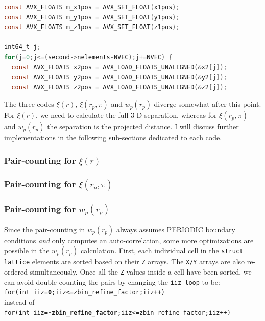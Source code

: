 \documentclass[12pt,titlepage,justified]{article}
\newcommand{\xir}{\ensuremath{{\xi(r)}}\xspace}
\newcommand{\wprp}{\ensuremath{{w_p(r_p)}}\xspace}
\newcommand{\xirppi}{\ensuremath{{\xi(r_p,\pi)}}\xspace}
\begin{document}
\begin{lstlisting}[language=C,numbers=none,label={code:looping_over_second_particles},caption={AVX intrinsics for looping over all particles in the \texttt{second} cell. PERIODIC boundary conditions have 
already been accounted for in \texttt{x1pos,y1pos,z1pos} variables.},basicstyle=\scriptsize]
const AVX_FLOATS m_x1pos = AVX_SET_FLOAT(x1pos);
const AVX_FLOATS m_y1pos = AVX_SET_FLOAT(y1pos);
const AVX_FLOATS m_z1pos = AVX_SET_FLOAT(z1pos);

int64_t j;
for(j=0;j<=(second->nelements-NVEC);j+=NVEC) {
  const AVX_FLOATS x2pos = AVX_LOAD_FLOATS_UNALIGNED(&x2[j]);
  const AVX_FLOATS y2pos = AVX_LOAD_FLOATS_UNALIGNED(&y2[j]);
  const AVX_FLOATS z2pos = AVX_LOAD_FLOATS_UNALIGNED(&z2[j]);
\end{lstlisting}  
The three codes \xir, \xirppi and \wprp diverge somewhat after this point. For \xir, we need to calculate the full 3-D separation, whereas for \xirppi and \wprp 
the separation is the projected distance. I will discuss further implementations in the following sub-sections dedicated to each code. 
\subsubsection{Pair-counting for \texorpdfstring{\xir}{xi(r)}}\label{section:pair_counting_r}
\subsubsection{Pair-counting for \texorpdfstring{\xirppi}{xi(rp,pi)}}\label{section:pair_counting_rp_pi}
\subsubsection{Pair-counting for \texorpdfstring{\wprp}{wp(rp)}}\label{section:pair_counting_wp}
Since the pair-counting in \wprp always assumes PERIODIC boundary conditions {\em and} only computes an auto-correlation, some more optimizations are possible in the
\wprp calculation. First, each individual cell in the \texttt{struct lattice} elements are sorted based on their \texttt{Z} arrays. The \texttt{X/Y} arrays are 
also re-ordered simultaneously. Once all the \texttt{Z} values inside a cell have been sorted, we can avoid double-counting the pairs by changing the \texttt{iiz loop}
to be:\\
\vspace{0.2in}
\texttt{for(int iiz={\bf 0};iiz<=zbin\_refine\_factor;iiz++)} 
\vspace{0.2in}
\\instead of\\
\vspace{0.2in}
\texttt{for(int iiz={\bf -zbin\_refine\_factor};iiz<=zbin\_refine\_factor;iiz++)} 
\vspace{0.2in}
\end{document}
